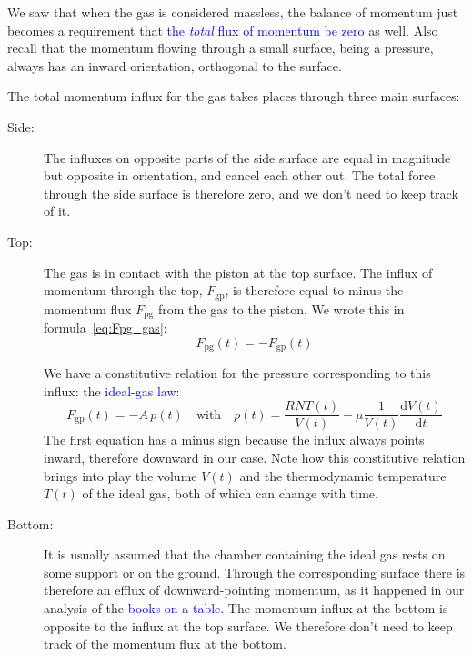 \documentclass[a4paper,12pt,%
onecolumn,oneside,titlepage,%
british%
]{memoir}
\newcommand*{\di}{\mathrm{d}}%
\renewcommand*{\|}[1][]{\nonscript\:#1\vert\nonscript\:\mathopen{}}
\newcommand*{\sect}{\S}%
\renewcommand*{\autoref}[2]{\sidepar{\vspace{-1ex}\footnotesize{\color{blue}\faIcon{%
reply%
}\enspace\sect\,\ref{#1} page\,\pageref{#1}}}\textcolor{blue}{#2}}
\newcommand*{\ypr}{p}
\newcommand*{\yN}{N}
\newcommand*{\yFpg}{F_{\text{pg}}}
\newcommand*{\yFgp}{F_{\text{gp}}}
\newcommand*{\yvis}{\mu}%
\newcommand*{\yte}{T}%
\begin{document}
\medskip

We saw that when the gas is considered massless, the balance of momentum just becomes a requirement that \autoref{sec:further_idealgas}{the \emph{total} flux of momentum be zero} as well. Also recall that the momentum flowing through a small surface, being a pressure, always has an inward orientation, orthogonal to the surface.

The total momentum influx for the gas takes places through three main surfaces:
\begin{description}
\item[Side:] The influxes on opposite parts of the side surface are equal in magnitude but opposite in orientation, and cancel each other out. The total force through the side surface is therefore zero, and we don't need to keep track of it.

\item[Top:] The gas is in contact with the piston at the top surface. The influx of momentum through the top, $\yFgp$, is therefore equal to minus the momentum flux $\yFpg$ from the gas to the piston. We wrote this in formula~\eqref{eq:Fpg_gas}:
  \begin{equation*}
    \yFpg(t) = -\yFgp(t)
  \end{equation*}

  We have a constitutive relation for the pressure corresponding to this influx: the \autoref{def:idealgas_law}{ideal-gas law}:
  \begin{equation*}
    \yFgp(t) = -A\,\ypr(t)
    \quad\text{with}\quad
    \ypr(t) = \frac{R \yN \yte(t)}{V(t)}  - \yvis \frac{1}{V(t)}\frac{\di V(t)}{\di t}
  \end{equation*}
  The first equation has a minus sign because the influx always points inward, therefore downward in our case. Note how this constitutive relation brings into play the volume $V(t)$ and the thermodynamic temperature $\yte(t)$ of the ideal gas, both of which can change with time.

\item[Bottom:] It is usually assumed that the chamber containing the ideal gas rests on some support or on the ground. Through the corresponding surface there is therefore an efflux of downward-pointing momentum, as it happened in our analysis of the \autoref{sec:bal_momentum_statics}{books on a table}. The momentum influx at the bottom is opposite to the influx at the top surface. We therefore don't need to keep track of the momentum flux at the bottom.
\end{description}
\end{document}
